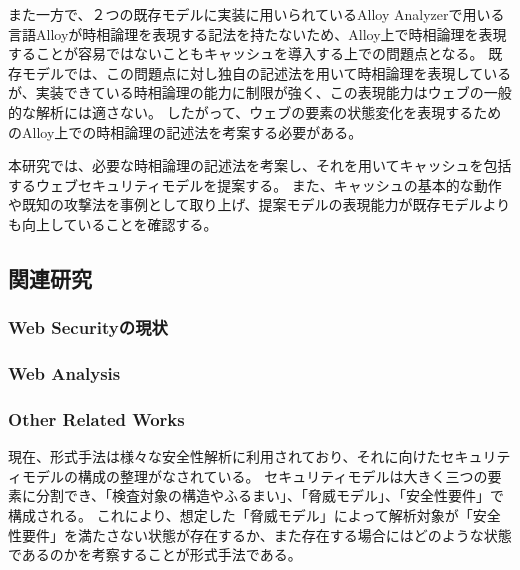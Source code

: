 \documentclass[journal]{IEEEtran}
\begin{document}
また一方で、２つの既存モデルに実装に用いられているAlloy Analyzerで用いる言語Alloyが時相論理を表現する記法を持たないため、Alloy上で時相論理を表現することが容易ではないこともキャッシュを導入する上での問題点となる。
既存モデル\cite{based-model, cookie-model}では、この問題点に対し独自の記述法を用いて時相論理を表現しているが、実装できている時相論理の能力に制限が強く、この表現能力はウェブの一般的な解析には適さない。
したがって、ウェブの要素の状態変化を表現するためのAlloy上での時相論理の記述法を考案する必要がある。






本研究では、必要な時相論理の記述法を考案し、それを用いてキャッシュを包括するウェブセキュリティモデルを提案する。
また、キャッシュの基本的な動作や既知の攻撃法を事例として取り上げ、提案モデルの表現能力が既存モデルよりも向上していることを確認する。

\subsection{関連研究}
\subsubsection{Web Securityの現状}
\subsubsection{Web Analysis}
\subsubsection{Other Related Works}


現在、形式手法は様々な安全性解析に利用されており、それに向けたセキュリティモデルの構成の整理がなされている\cite{security_modeling_and_analysis}。
セキュリティモデルは大きく三つの要素に分割でき、「検査対象の構造やふるまい」、「脅威モデル」、「安全性要件」で構成される。
これにより、想定した「脅威モデル」によって解析対象が「安全性要件」を満たさない状態が存在するか、また存在する場合にはどのような状態であるのかを考察することが形式手法である。
\end{document}
